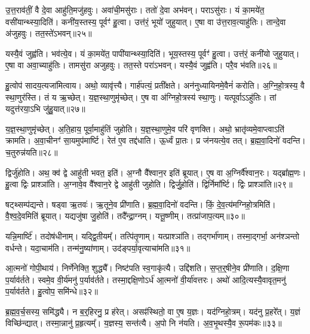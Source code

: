 उ॒त्त॒राव॑तीं॒ वै दे॒वा आहु॑ति॒मजु॑हवुः।
अवा॑ची॒मसु॑राः।
ततो॑ दे॒वा अभ॑वन्।
पराऽसु॑राः।
यं का॒मये॑त॒ वसी॑यान्थ्स्या॒दिति॑।
कनी॑य॒स्तस्य॒ पूर्वꣳ॑ हु॒त्वा।
उत्त॑रं॒ भूयो॑ जुहुयात्।
ए॒षा वा उ॑त्त॒राव॒त्याहु॑तिः।
तान्दे॒वा अ॑जुहवुः।
तत॒स्ते॑\-ऽभवन्॥२५॥

यस्यै॒वं जुह्व॑ति।
भव॑त्ये॒व।
यं का॒मये॑त॒ पापी॑यान्थ्स्या॒दिति॑।
भूय॒स्तस्य॒ पूर्वꣳ॑ हु॒त्वा।
उत्त॑रं॒ कनी॑यो जुहुयात्।
ए॒षा वा अवा॒च्याहु॑तिः।
तामसु॑रा अजुहवुः।
तत॒स्ते परा॑\-ऽभवन्।
यस्यै॒वं जुह्व॑ति।
परै॒व भ॑वति॥२६॥

हु॒त्वोप॑ सादय॒त्यजा॑मित्वाय।
अथो॒ व्यावृ॑त्त्यै।
गार्\mbox{}ह॑पत्यं॒ प्रती᳚क्षते।
अन॑नुध्यायिनमे॒वैनं॑ करोति।
अ॒ग्नि॒हो॒त्रस्य॒ वै स्था॒णुर॑स्ति।
तं य ऋ॒च्छेत्।
य॒ज्ञ॒स्था॒णुमृ॑च्छेत्।
ए॒ष वा अ॑ग्निहो॒त्रस्य॑ स्था॒णुः।
यत्पूर्वा\-ऽऽहु॑तिः।
तां यदुत्त॑रया॒ऽभि जु॑हु॒यात्॥२७॥

य॒ज्ञ॒स्था॒णुमृ॑च्छेत्।
अ॒ति॒हाय॒ पूर्वा॒माहु॑तिं जुहोति।
य॒ज्ञ॒स्था॒णुमे॒व परि॑ वृणक्ति।
अथो॒ भ्रातृ॑व्यमे॒वाप्त्वाऽति॑ क्रामति।
अ॒वा॒चीनꣳ॑ सा॒यमुप॑मार्ष्टि।
रेत॑ ए॒व तद्द॑धाति।
ऊ॒र्ध्वं प्रा॒तः।
प्र ज॑नयत्ये॒व तत्।
ब्र॒ह्म॒वा॒दिनो॑ वदन्ति।
च॒तुरुन्न॑यति॥२८॥

द्विर्जु॑होति।
अथ॒ क्व॑ द्वे आहु॑ती भवत॒ इति॑।
अ॒ग्नौ वै᳚श्वान॒र इति॑ ब्रूयात्।
ए॒ष वा अ॒ग्निर्वै᳚श्वान॒रः।
यद्ब्रा᳚ह्म॒णः।
हु॒त्वा द्विः प्राश्ञा॑ति।
अ॒ग्नावे॒व वै᳚श्वान॒रे द्वे आहु॑ती जुहोति।
द्विर्जु॒होति॑।
द्विर्निमा᳚र्ष्टि।
द्विः प्राश्ञा॑ति॥२९॥

षट्थ्सम्प॑द्यन्ते।
षड्वा ऋ॒तवः॑।
ऋ॒तूने॒व प्री॑णाति।
ब्र॒ह्म॒वा॒दिनो॑ वदन्ति।
किं॒ दे॒व॒त्य॑मग्निहो॒त्रमिति॑।
वै॒श्व॒दे॒वमिति॑ ब्रूयात्।
यद्यजु॑षा जु॒होति॑।
तदै᳚न्द्रा॒ग्नम्।
यत्तू॒ष्णीम्।
तत्प्रा॑जाप॒त्यम्॥३०॥

यन्नि॒मार्ष्टि॑।
तदोष॑धीनाम्।
यद्द्वि॒तीयम्᳚।
तत्पि॑तृ॒णाम्।
यत्प्राश्ञा॑ति।
तद्गर्भा॑णाम्।
तस्मा॒द्गर्भा॒ अन॑श्ञन्तो वर्धन्ते।
यदा॒चाम॑ति।
तन्म॑नु॒ष्या॑णाम्।
उद॑ङ्पर्या॒वृत्याचा॑मति॥३१॥

आ॒त्मनो॑ गोपी॒थाय॑।
निर्णे॑नेक्ति॒ शुद्ध्यै᳚।
निष्ट॑पति स्व॒गाकृ॑त्यै।
उद्दि॑शति।
स॒प्त॒र्॒षीने॒व प्री॑णाति।
द॒क्षि॒णा प॒र्याव॑र्तते।
स्वमे॒व वी॒र्य॑मनु॑ प॒र्याव॑र्तते।
तस्मा॒द्दक्षि॒णो\-ऽर्ध॑ आ॒त्मनो॑ वी॒र्या॑वत्तरः।
अथो॑ आदि॒त्यस्यै॒वावृत॒मनु॑ प॒र्याव॑र्तते।
हु॒त्वोप॒ समि॑न्धे॥३२॥

ब्र॒ह्म॒व॒र्च॒सस्य॒ समि॑द्ध्यै।
न ब॒र्॒हिरनु॒\- प्र ह॑रेत्।
असꣴ॑स्थितो॒ वा ए॒ष य॒ज्ञः।
यद॑ग्निहो॒त्रम्।
यद॑नु प्र॒हरे᳚त्।
य॒ज्ञं वि\-च्छि॑न्द्यात्।
तस्मा॒न्नानु॑ प्र॒हृत्यम्᳚।
य॒ज्ञस्य॒ सन्त॑त्यै।
अ॒पो नि न॑यति।
अ॒व॒भृ॒थस्यै॒व रू॒पम॑कः॥३३॥\anuvakamend[अ॒भ॒व॒न्भ॒व॒ति॒ जु॒हु॒यान्न॑यति मार्ष्टि॒ द्विः प्राश्ञा॑ति प्राजाप॒त्यमाचा॑मतीन्धे\-ऽकः]

